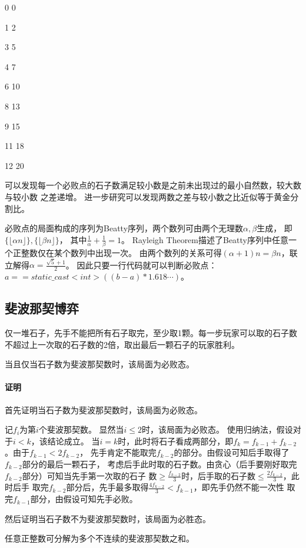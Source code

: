 0 0

1 2

3 5

4 7

6 10

8 13

9 15

11 18

12 20

可以发现每一个必败点的石子数满足较小数是之前未出现过的最小自然数，较大数与较小数
之差递增。
进一步研究可以发现两数之差与较小数之比近似等于黄金分割比。

必败点的局面构成的序列为Beatty序列，两个数列可由两个无理数$\alpha,\beta$生成，
即$\{\lfloor\alpha n\rfloor\},\{\lfloor\beta n\rfloor\}$，
其中$\frac{1}{\alpha}+\frac{1}{\beta}=1$。
Rayleigh Theorem描述了Beatty序列中任意一个正整数仅在某个数列中出现一次。
由两个数列的关系可得$(\alpha+1)n=\beta n$，联立解得$\alpha=\frac{\sqrt{5}+1}{2}$。
因此只要一行代码就可以判断必败点：$a==static\_cast<int>((b-a)*1.618\cdots)$。

\subsection{斐波那契博弈}
仅一堆石子，先手不能把所有石子取完，至少取1颗。每一步玩家可以取的石子数
不超过上一次取的石子数的2倍，取出最后一颗石子的玩家胜利。

\begin{theorem}
	当且仅当石子数为斐波那契数时，该局面为必败态。
\end{theorem}

\paragraph{证明}
首先证明当石子数为斐波那契数时，该局面为必败态。

记$f_i$为第$i$个斐波那契数。
显然当$i\leq 2$时，该局面为必败态。
使用归纳法，假设对于$i<k$，该结论成立。
当$i=k$时，此时将石子看成两部分，即$f_k=f_{k-1}+f_{k-2}$。由于$f_{k-1}<2f_{k-2}$，
先手肯定不能取完$f_{k-2}$的部分。由假设可知后手取得了$f_{k-2}$部分的最后一颗石子，
考虑后手此时取的石子数。由贪心（后手要刚好取完$f_{k-2}$部分）可知当先手第一次取的石子
数$\geq \frac{f_{k-2}}{3}$时，后手取的石子数$\leq \frac{2f_{k-2}}{3}$，此时后手
取完$f_{k-2}$部分后，先手最多取得$\frac{4f_{k-2}}{3}<f_{k-1}$，即先手仍然不能一次性
取完$f_{k-1}$部分，由假设可知先手必败。

然后证明当石子数不为斐波那契数时，该局面为必胜态。
\begin{lemma}
	任意正整数可分解为多个不连续的斐波那契数之和。
\end{lemma}

